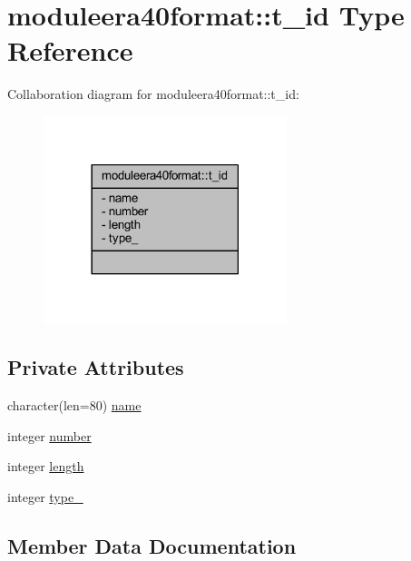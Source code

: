 \hypertarget{structmoduleera40format_1_1t__id}{}\section{moduleera40format\+:\+:t\+\_\+id Type Reference}
\label{structmoduleera40format_1_1t__id}


Collaboration diagram for moduleera40format\+:\+:t\+\_\+id\+:\nopagebreak
\begin{figure}[H]
\begin{center}
\leavevmode
\includegraphics[width=201pt]{structmoduleera40format_1_1t__id__coll__graph}
\end{center}
\end{figure}
\subsection*{Private Attributes}
\begin{DoxyCompactItemize}
\item 
character(len=80) \mbox{\hyperlink{structmoduleera40format_1_1t__id_afa33fc1f360e772537b29ea38d1911f2}{name}}
\item 
integer \mbox{\hyperlink{structmoduleera40format_1_1t__id_ac316b53817b80cc82f5433897917e79d}{number}}
\item 
integer \mbox{\hyperlink{structmoduleera40format_1_1t__id_af157698cd96d260b354e2952f6c7a44d}{length}}
\item 
integer \mbox{\hyperlink{structmoduleera40format_1_1t__id_a2a1a326fc0f0ce6089c6b51ad1bdb39a}{type\+\_\+}}
\end{DoxyCompactItemize}


\subsection{Member Data Documentation}
\mbox{\label{structmoduleera40format_1_1t__id_af157698cd96d260b354e2952f6c7a44d}} 
